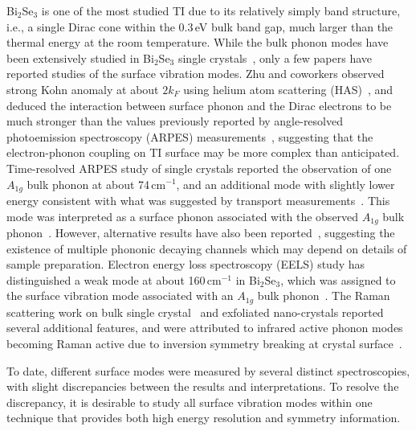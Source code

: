 \documentclass[reprint,aps,pra,superscriptaddress,amsmath,amssymb,linenumbers,longbibliography]{revtex4-1}
\begin{document}
Bi$_2$Se$_3$ is one of the most studied TI due to its relatively simply band structure, i.e., a single Dirac cone within the 0.3\,eV bulk band gap, much larger than the thermal energy at the room temperature.
While the bulk phonon modes have been extensively studied in Bi$_2$Se$_3$ single crystals~\cite{Kohler1974,Richter1977,LaForge2010,Zhao2011,Zhang2011,Gnezdilov2011,Kim2012,Humlicek2014,Irfan2014,Eddrief2014,Yan2015,Zhang2016}, only a few papers have reported studies of the surface vibration modes.
Zhu and coworkers observed strong Kohn anomaly at about $2k_F$ using helium atom scattering (HAS)~\cite{Zhu2011}, and deduced the interaction between surface phonon and the Dirac electrons to be much stronger than the values previously reported by angle-resolved photoemission spectroscopy (ARPES) measurements~\cite{Zhu2012,Howard2013,Hatch2011,Pan2012}, suggesting that the electron-phonon coupling on TI surface may be more complex than anticipated.
Time-resolved ARPES study of single crystals reported the observation of one $A_{1g}$ bulk phonon at about 74\,cm$^{-1}$, and an additional mode with slightly lower energy consistent with what was suggested by transport measurements~\cite{Costache2014}.
This mode was interpreted as a surface phonon associated with the observed $A_{1g}$ bulk phonon~\cite{Sobota2014}.
However, alternative results have also been reported~\cite{Hatch2011,Fedorov2012,Chen2013,Kondo2013}, suggesting the existence of multiple phononic decaying channels which may depend on details of sample preparation.
Electron energy loss spectroscopy (EELS) study has distinguished a weak mode at about 160\,cm$^{-1}$ in Bi$_2$Se$_3$, which was assigned to the surface vibration mode associated with an $A_{1g}$ bulk phonon~\cite{Kogar2015}.
The Raman scattering work on bulk single crystal~\cite{Gnezdilov2011} and exfoliated nano-crystals reported several additional features, and were attributed to infrared active phonon modes becoming Raman active due to inversion symmetry breaking at crystal surface~\cite{Eddrief2014,Zhao2011}.

To date, different surface modes were measured by several distinct spectroscopies, with slight discrepancies between the results and interpretations.
To resolve the discrepancy, it is desirable to study all surface vibration modes within one technique that provides both high energy resolution and symmetry information.
\end{document}
